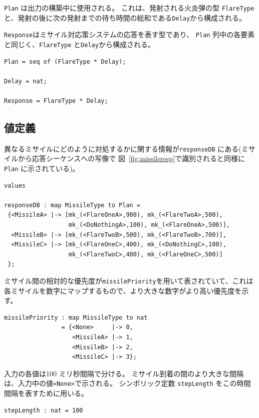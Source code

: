 \documentclass[\pformat,12pt]{jreport}
\begin{document}
\texttt{Plan} は出力の構築中に使用される。
これは、発射される火炎弾の型 \texttt{FlareType} と、発射の後に次の発射までの待ち時間の総和である\texttt{Delay}から構成される。

\texttt{Response}はミサイル対応策システムの応答を表す型であり、 \texttt{Plan} 列中の各要素と同じく、\texttt{FlareType} と\texttt{Delay}から構成される。

\begin{lstlisting}
Plan = seq of (FlareType * Delay);

Delay = nat;

Response = FlareType * Delay;
\end{lstlisting}

\subsection{値定義}

異なるミサイルにどのように対処するかに関する情報が\texttt{responseDB} にある(ミサイルから応答シーケンスへの写像で 図~\ref{fig:missileresp}で識別されると同様に\texttt{Plan} に示されている)。

\begin{lstlisting}
values

responseDB : map MissileType to Plan =
 {<MissileA> |-> [mk_(<FlareOneA>,900), mk_(<FlareTwoA>,500),
                  mk_(<DoNothingA>,100), mk_(<FlareOneA>,500)],
  <MissileB> |-> [mk_(<FlareTwoB>,500), mk_(<FlareTwoB>,700)],
  <MissileC> |-> [mk_(<FlareOneC>,400), mk_(<DoNothingC>,100),
                  mk_(<FlareTwoC>,400), mk_(<FlareOneC>,500)]
 };
\end{lstlisting}

ミサイル間の相対的な優先度が\texttt{missilePriority}を用いて表されていて、これは各ミサイルを数字にマップするもので、より大きな数字がより高い優先度を示す。

\begin{lstlisting}
missilePriority : map MissileType to nat
                = {<None>     |-> 0,
                   <MissileA> |-> 1,
                   <MissileB> |-> 2,
                   <MissileC> |-> 3};
\end{lstlisting}

入力の各値は100 ミリ秒間隔で分ける。
ミサイル到着の間のより大きな間隔は、入力中の値\texttt{<None>}で示される。
シンボリック定数 \texttt{stepLength} をこの時間間隔を表すために用いる。

\begin{lstlisting}
stepLength : nat = 100
\end{lstlisting}
\end{document}
